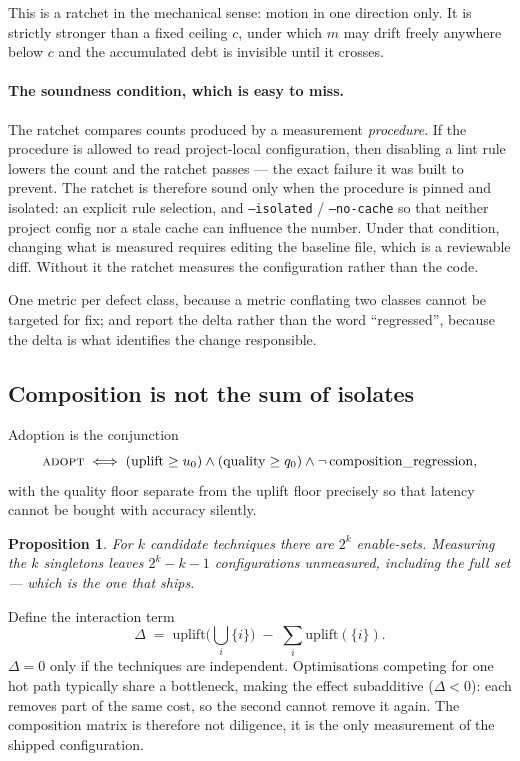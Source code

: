 \documentclass[11pt]{article}
\newtheorem{prop}{Proposition}[section]
\begin{document}
This is a ratchet in the mechanical sense: motion in one direction only. It is
strictly stronger than a fixed ceiling $c$, under which $m$ may drift freely
anywhere below $c$ and the accumulated debt is invisible until it crosses.

\paragraph{The soundness condition, which is easy to miss.} The ratchet
compares counts produced by a measurement \emph{procedure}. If the procedure is
allowed to read project-local configuration, then disabling a lint rule lowers
the count and the ratchet passes --- the exact failure it was built to prevent.
The ratchet is therefore sound only when the procedure is pinned and isolated:
an explicit rule selection, and \texttt{--isolated} / \texttt{--no-cache} so
that neither project config nor a stale cache can influence the number. Under
that condition, changing what is measured requires editing the baseline file,
which is a reviewable diff. Without it the ratchet measures the configuration
rather than the code.

One metric per defect class, because a metric conflating two classes cannot be
targeted for fix; and report the delta rather than the word ``regressed'',
because the delta is what identifies the change responsible.

\subsection{Composition is not the sum of isolates}
\label{lbl:HS-EVID-03}

Adoption is the conjunction
\begin{equation}
\textsc{adopt} \iff (\mathrm{uplift} \ge u_0) \wedge (\mathrm{quality} \ge q_0)
\wedge \neg\,\mathrm{composition\_regression},
\end{equation}
with the quality floor separate from the uplift floor precisely so that latency
cannot be bought with accuracy silently.

\begin{prop}
For $k$ candidate techniques there are $2^k$ enable-sets. Measuring the $k$
singletons leaves $2^k - k - 1$ configurations unmeasured, including the
full set --- which is the one that ships.
\end{prop}

Define the interaction term
\begin{equation}
\Delta \;=\; \mathrm{uplift}\Big(\bigcup_i \{i\}\Big) \;-\; \sum_i
\mathrm{uplift}(\{i\}).
\end{equation}
$\Delta = 0$ only if the techniques are independent. Optimisations competing for
one hot path typically share a bottleneck, making the effect subadditive
($\Delta < 0$): each removes part of the same cost, so the second cannot remove
it again. The composition matrix is therefore not diligence, it is the only
measurement of the shipped configuration.
\end{document}

